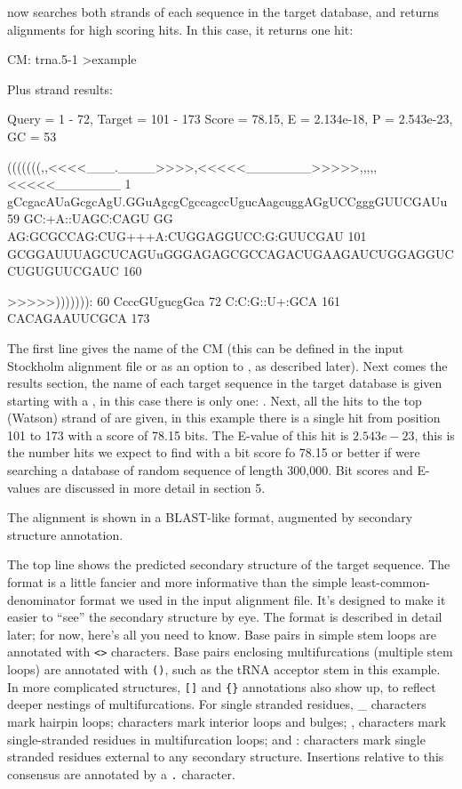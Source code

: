  now searches both strands of each sequence in the
target database, and returns alignments for high scoring hits.  In
this case, it returns one hit:

\begin{sreoutput}
CM: trna.5-1
>example

  Plus strand results:

 Query = 1 - 72, Target = 101 - 173
 Score = 78.15, E = 2.134e-18, P = 2.543e-23, GC =  53

           (((((((,,<<<<___.____>>>>,<<<<<_______>>>>>,,,,,<<<<<_______
         1 gCcgacAUaGcgcAgU.GGuAgcgCgccagccUgucAagcuggAGgUCCgggGUUCGAUu 59      
           GC:+A::UAGC:CAGU GG AG:GCGCCAG:CUG+++A:CUGGAGGUCC:G:GUUCGAU 
       101 GCGGAUUUAGCUCAGUuGGGAGAGCGCCAGACUGAAGAUCUGGAGGUCCUGUGUUCGAUC 160     

           >>>>>))))))):
        60 CcccGUgucgGca 72      
           C:C:G::U+:GCA
       161 CACAGAAUUCGCA 173     
\end{sreoutput}

The first line gives the name of the CM (this can be defined in the
input Stockholm alignment file or as an option to , as
described later). Next comes the results section, the name of each
target sequence in the target database is given starting with a
\prog{$>$}, in this case there is only one: . Next, all
the hits to the top (Watson) strand of  are given, in
this example there is a single hit from position 101 to 173 with a
score of 78.15 bits. The E-value of this hit is $2.543e-23$, this is
the number hits we expect to find with a bit score fo 78.15 or better
if were searching a database of random sequence of length 300,000. 
Bit scores and E-values are discussed in more detail in section 5.

The alignment is shown in a BLAST-like format, augmented by secondary
structure annotation. 

The top line shows the predicted secondary structure of the target
sequence. The format is a little fancier and more informative than the
simple least-common-denominator format we used in the input alignment
file. It's designed to make it easier to ``see'' the secondary
structure by eye. The format is described in detail later; for now,
here's all you need to know. Base pairs in simple stem loops are
annotated with \verb+<>+ characters. Base pairs enclosing
multifurcations (multiple stem loops) are annotated with \verb+()+,
such as the tRNA acceptor stem in this example. In more complicated
structures, \verb+[]+ and \verb+{}+ annotations also show up, to
reflect deeper nestings of multifurcations. For single stranded
residues, \_ characters mark hairpin loops; \- characters mark
interior loops and bulges; , characters mark single-stranded residues
in multifurcation loops; and : characters mark single stranded
residues external to any secondary structure. Insertions relative to
this consensus are annotated by a \verb+.+ character.

